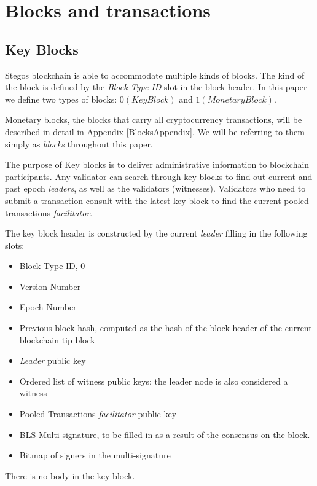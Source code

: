 \documentclass[8pt,fleqn,openany]{book}
\begin{document}
\chapter{Blocks and transactions}\label{app:blocks}

\section{Key Blocks}

Stegos blockchain is able to accommodate multiple kinds of blocks. The kind of the block is defined by the \textit{Block Type ID} slot in the block header. In this paper we define two types of blocks: $0 (KeyBlock)$ and $1 (MonetaryBlock)$.

Monetary blocks, the blocks that carry all cryptocurrency transactions, will be described in detail in Appendix \ref{BlocksAppendix}. We will be referring to them simply as \textit{blocks} throughout this paper. 

The purpose of Key blocks is to deliver administrative information to blockchain participants. Any validator can search through key blocks to find out current and past epoch \textit{leaders}, as well as the validators (witnesses). Validators who need to submit a transaction consult with the latest key block to find the current pooled transactions \textit{facilitator}.

The key block header is constructed by the current \textit{leader} filling in the following slots:

\begin{itemize}
  \item {Block Type ID, 0}
  \item {Version Number}
  \item {Epoch Number}
  \item {Previous block hash, computed as the hash of the block header of the current blockchain tip block}
  \item {\textit{Leader} public key}
  \item {Ordered list of witness public keys; the leader node is also considered a witness}
  \item {Pooled Transactions \textit{facilitator} public key}
  \item {BLS Multi-signature, to be filled in as a result of the consensus on the block.}
  \item {Bitmap of signers in the multi-signature}
\end{itemize}

There is no body in the key block.
\end{document}
